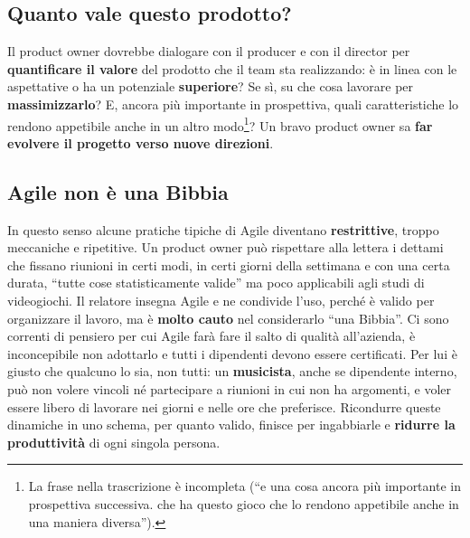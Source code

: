 \subsection{Quanto vale questo prodotto?}

Il product owner dovrebbe dialogare con il producer e con il director per
\textbf{quantificare il valore} del prodotto che il team sta realizzando: è in
linea con le aspettative o ha un potenziale \textbf{superiore}? Se sì, su che
cosa lavorare per \textbf{massimizzarlo}? E, ancora più importante in
prospettiva, quali caratteristiche lo rendono appetibile anche in un altro
modo\footnote{La frase nella trascrizione è incompleta (``e una cosa ancora più
importante in prospettiva successiva. che ha questo gioco che lo rendono
appetibile anche in una maniera diversa'').}? Un bravo product owner sa
\textbf{far evolvere il progetto verso nuove direzioni}.

\subsection{Agile non è una Bibbia}

In questo senso alcune pratiche tipiche di Agile diventano \textbf{restrittive},
troppo meccaniche e ripetitive. Un product owner può rispettare alla lettera i
dettami che fissano riunioni in certi modi, in certi giorni della settimana e
con una certa durata, ``tutte cose statisticamente valide'' ma poco applicabili
agli studi di videogiochi. Il relatore insegna Agile e ne condivide l'uso, perché
è valido per organizzare il lavoro, ma è \textbf{molto cauto} nel considerarlo
``una Bibbia''. Ci sono correnti di pensiero per cui Agile farà fare il salto di
qualità all'azienda, è inconcepibile non adottarlo e tutti i dipendenti devono
essere certificati. Per lui è giusto che qualcuno lo sia, non tutti: un
\textbf{musicista}, anche se dipendente interno, può non volere vincoli né
partecipare a riunioni in cui non ha argomenti, e voler essere libero di
lavorare nei giorni e nelle ore che preferisce. Ricondurre queste dinamiche in
uno schema, per quanto valido, finisce per ingabbiarle e \textbf{ridurre la
produttività} di ogni singola persona.

